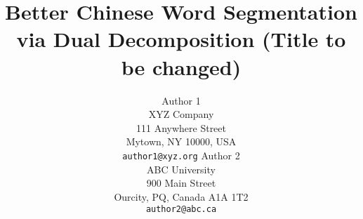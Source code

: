 \documentclass[11pt,letterpaper]{article}
\title{Better Chinese Word Segmentation via Dual Decomposition (Title to be changed)}
\author{Author 1\\
	    XYZ Company\\
	    111 Anywhere Street\\
	    Mytown, NY 10000, USA\\
	    {\tt author1@xyz.org}
	  \And
	Author 2\\
  	ABC University\\
  	900 Main Street\\
  	Ourcity, PQ, Canada A1A 1T2\\
  {\tt author2@abc.ca}}
\begin{document}
\maketitle
\begin{CJK}{UTF8}{gbsn} %

 
 \label{sec:intro}
 \label{sec:relatedwork}
 \label{sec:dual-decomp}
 \label{sec:experiment}
 \label{sec:results}
 \label{sec:discussion}
 \label{sec:conclusion}




\end{CJK}
\end{document}

